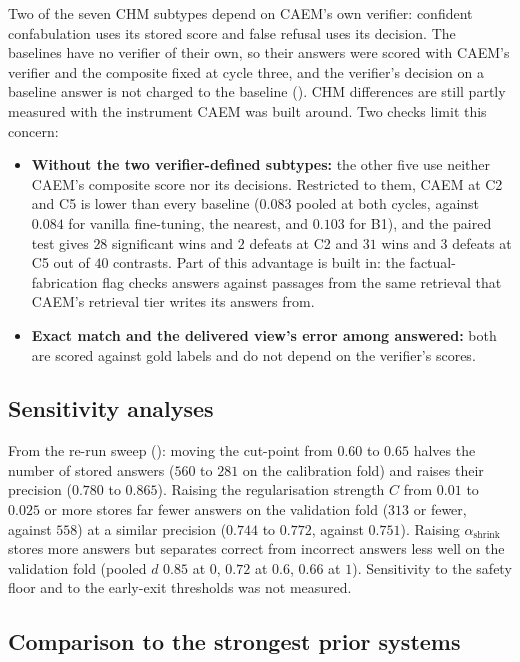 Two of the seven CHM subtypes depend on CAEM's own verifier: confident confabulation uses its stored score and false refusal uses its decision. The baselines have no verifier of their own, so their answers were scored with CAEM's verifier and the composite fixed at cycle three, and the verifier's decision on a baseline answer is not charged to the baseline (). CHM differences are still partly measured with the instrument CAEM was built around. Two checks limit this concern:
\begin{itemize}
    \item \textbf{Without the two verifier-defined subtypes:} the other five use neither CAEM's composite score nor its decisions. Restricted to them, CAEM at C2 and C5 is lower than every baseline ($0.083$ pooled at both cycles, against $0.084$ for vanilla fine-tuning, the nearest, and $0.103$ for B1), and the paired test gives $28$ significant wins and $2$ defeats at C2 and $31$ wins and $3$ defeats at C5 out of $40$ contrasts. Part of this advantage is built in: the factual-fabrication flag checks answers against passages from the same retrieval that CAEM's retrieval tier writes its answers from.
    \item \textbf{Exact match and the delivered view's error among answered:} both are scored against gold labels and do not depend on the verifier's scores.
\end{itemize}

\subsection{Sensitivity analyses}
\label{sec:disc-sensitivity}

From the re-run sweep (): moving the cut-point from $0.60$ to $0.65$ halves the number of stored answers ($560$ to $281$ on the calibration fold) and raises their precision ($0.780$ to $0.865$). Raising the regularisation strength $C$ from $0.01$ to $0.025$ or more stores far fewer answers on the validation fold ($313$ or fewer, against $558$) at a similar precision ($0.744$ to $0.772$, against $0.751$). Raising $\alpha_{\text{shrink}}$ stores more answers but separates correct from incorrect answers less well on the validation fold (pooled $d$ $0.85$ at $0$, $0.72$ at $0.6$, $0.66$ at $1$). Sensitivity to the safety floor and to the early-exit thresholds was not measured.

\subsection{Comparison to the strongest prior systems}
\label{sec:disc-prior}

